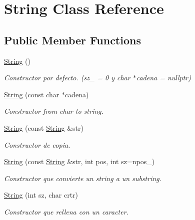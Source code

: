 \hypertarget{class_string}{}\section{String Class Reference}
\label{class_string}
\subsection*{Public Member Functions}
\begin{DoxyCompactItemize}
\item 
\mbox{\label{class_string_a8a7ef356e05eb9b1ea1ab518baee3095}} 
\hyperlink{class_string_a8a7ef356e05eb9b1ea1ab518baee3095}{String} ()
\begin{DoxyCompactList}\small\item\em Constructor por defecto. (sz\+\_\+ = 0 y char $\ast$cadena = nullptr) \end{DoxyCompactList}\item 
\hyperlink{class_string_a4c35f4fb85fec55f015c3605e9160d60}{String} (const char $\ast$cadena)
\begin{DoxyCompactList}\small\item\em Constructor from char to string. \end{DoxyCompactList}\item 
\hyperlink{class_string_a5774bcd4a4c232a8aec5a3ec6d01a157}{String} (const \hyperlink{class_string}{String} \&str)
\begin{DoxyCompactList}\small\item\em Constructor de copia. \end{DoxyCompactList}\item 
\hyperlink{class_string_a1c734262c5ac194c3a4f9639907afea1}{String} (const \hyperlink{class_string}{String} \&str, int pos, int sz=npos\+\_\+)
\begin{DoxyCompactList}\small\item\em Constructor que convierte un string a un substring. \end{DoxyCompactList}\item 
\hyperlink{class_string_a202b1b80228ec2d6e9274064f412a91d}{String} (int sz, char crtr)
\begin{DoxyCompactList}\small\item\em Constructor que rellena con un caracter. \end{DoxyCompactList}\item 
\mbox{\label{class_string_ac40b2a3fb58c2d8556f5e6ff73510036}} 

\end{DoxyCompactItemize}
